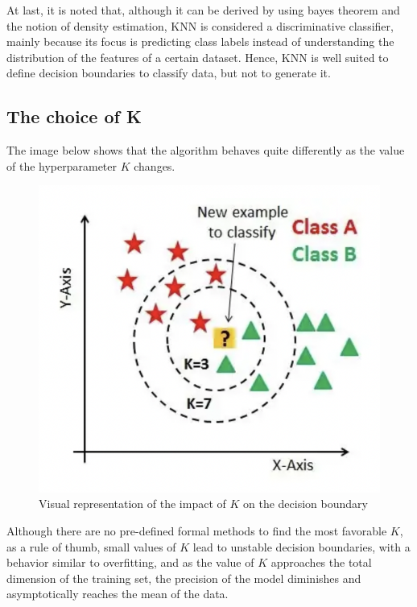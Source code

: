 At last, it is noted that, although it can be derived by using bayes theorem and the notion of density estimation, KNN is considered a discriminative classifier, mainly because its focus is predicting class labels instead of understanding the distribution of the features of a certain dataset. Hence, KNN is well suited to define decision boundaries to classify data, but not to generate it.

\subsection{The choice of K}

The image below shows that the algorithm behaves quite differently as the value of the hyperparameter $K$ changes.

\begin{figure}[h]
    \centering
    \includegraphics[scale=0.75]{images/knn/meaning-of-k.png}
    \caption{Visual representation of the impact of $K$ on the decision boundary}
    \label{fig:knn_k_hyperparam}
\end{figure}

Although there are no pre-defined formal methods to find the most favorable $K$, as a rule of thumb, small values of $K$ lead to unstable decision boundaries, with a behavior similar to overfitting, and as the value of $K$ approaches the total dimension of the training set, the precision of the model diminishes and asymptotically reaches the mean of the data.

